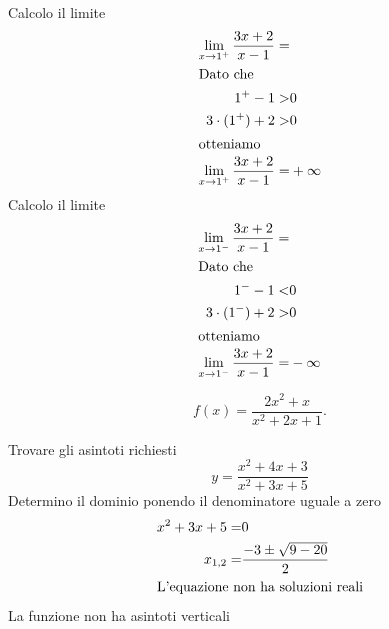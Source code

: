 \begin{exercise}
Calcolo il limite
\begin{align*}
\lim_{x\to 1^+}\frac{3x+2}{x-1}=&\\
\intertext{Dato che}
1^+-1>&0\\
3\cdot (1^+)+2>&0\\
\intertext{otteniamo}
\lim_{x\to 1^+}\frac{3x+2}{x-1}=&+\infty\\
\end{align*} 
Calcolo il limite
\begin{align*}
\lim_{x\to 1^-}\frac{3x+2}{x-1}=&\\
\intertext{Dato che}
1^--1<&0\\
3\cdot (1^-)+2>&0\\
\intertext{otteniamo}
\lim_{x\to 1^-}\frac{3x+2}{x-1}=&-\infty\\
\end{align*} 
\end{exercise}
\begin{exercise}[no solution]
	
	\begin{equation*}
	f(x)= \frac{2x^2+x}{x^2+2x+1}.
	\end{equation*}
\end{exercise}
\begin{exercise}
	Trovare gli asintoti richiesti
\[y=\dfrac{x^2+4x+3}{x^2+3x+5}\]
	\tcblower
Determino il dominio ponendo il denominatore uguale a zero
\begin{align*}
x^2+3x+5=&0\\ 
x_{1,2}=&\dfrac{-3\pm\sqrt{9-20}}{2}\\
\intertext{L'equazione non ha soluzioni reali}
\end{align*}
La funzione non ha asintoti verticali
\end{exercise}
